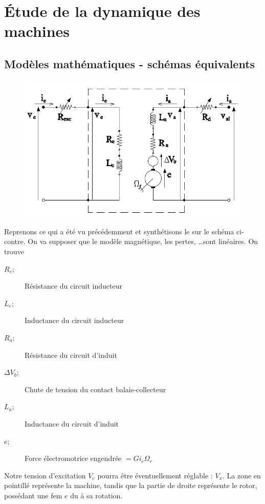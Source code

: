\newpage
\section{Étude de la dynamique des machines}
	\subsection{Modèles mathématiques - schémas équivalents}
		\begin{figure}
	\includegraphics[scale=0.34]{ch4/image15.png}
	\end{figure}
	Reprenons ce qui a été vu précédemment et synthétisons le sur le schéma ci-contre. 
	On va supposer que le modèle magnétique, les pertes, \dots sont linéaires. On 
	trouve 
	\begin{description}
	\item[$R_e$;] Résistance du circuit inducteur
	\item[$L_e$;] Inductance du circuit inducteur
	\item[$R_a$;] Résistance du circuit d'induit
	\item[$\Delta V_b$;] Chute de tension du contact balais-collecteur
	\item[$L_a$;] Inductance du circuit d'induit
	\item[$e$;] Force électromotrice engendrée $= Gi_e\Omega_r$
\end{description}		
	Notre tension d'excitation $V_e$ pourra être éventuellement réglable : $V_x$. La 
	zone en pointillé représente la machine, tandis que la partie de droite représente 
	le rotor, possédant une fem $e$ du à sa rotation.\\
	

